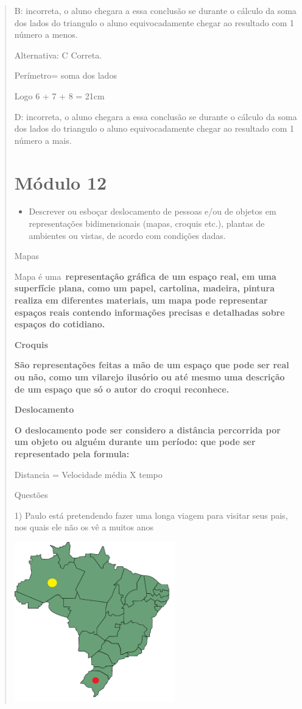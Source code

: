 \begin{quote}
\begin{escolha}
B: incorreta, o aluno chegara a essa conclusão se durante o cálculo da
soma dos lados do triangulo o aluno equivocadamente chegar ao resultado
com 1 número a menos.

Alternativa: C Correta.

Perímetro= soma dos lados

Logo 6 + 7 + 8 = 21cm

D: incorreta, o aluno chegara a essa conclusão se durante o cálculo da
soma dos lados do triangulo o aluno equivocadamente chegar ao resultado
com 1 número a mais.

\chapter{Módulo 12}

\begin{itemize}
\tightlist
\item
  Descrever ou esboçar deslocamento de pessoas e/ou de objetos em
  representações bidimensionais (mapas, croquis etc.), plantas de
  ambientes ou vistas, de acordo com condições dadas.
\end{itemize}

Mapas

Mapa é uma~\textbf{representação gráfica de um espaço real, em uma
superfície plana, como um papel, cartolina, madeira, pintura realiza em
diferentes materiais, um mapa pode representar espaços reais contendo
informações precisas e detalhadas sobre espaços do cotidiano.}

\textbf{Croquis}

\textbf{São representações feitas a mão de um espaço que pode ser real
ou não, como um vilarejo ilusório ou até mesmo uma descrição de um
espaço que só o autor do croqui reconhece.}

\textbf{Deslocamento}

\textbf{O deslocamento pode ser considero a distância percorrida por um
objeto ou alguém durante um período: que pode ser representado pela
formula:}

Distancia = Velocidade média X tempo

Questões

1) Paulo está pretendendo fazer uma longa viagem para visitar seus pais,
nos quais ele não os vê a muitos anos

\includegraphics[width=2.73952in,height=2.725in]{./imgSAEB_8_MAT/media/image36.png}


\end{escolha}
\end{quote}
